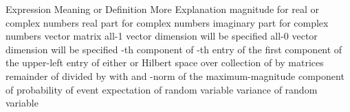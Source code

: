 \starttitle [title={Notation}]

\starttable[|l|l|l|] \HL
\NC Expression \VL Meaning or Definition \VL More Explanation \SR \HL
\NC {} \VL magnitude \VL for real or complex numbers \AR \HL
\NC {} \VL real part \VL for complex numbers \AR \HL
\NC {} \VL imaginary part \VL for complex numbers \AR \HL
\NC {} \VL vector \VL \AR \HL
\NC {} \VL matrix \VL \AR \HL
\NC {} \VL all-1 vector \VL dimension will be specified \AR \HL
\NC {} \VL all-0 vector \VL dimension will be specified \AR \HL
\NC {} \VL {}-th component of  \VL \AR \HL
\NC {} \VL {}-th entry of  \VL \AR \HL
\NC {} \VL the first component of  \VL  \AR \HL
\NC {} \VL the upper-left entry of  \VL  \AR \HL
\NC {} \VL either  or  \VL  \AR \HL
\NC {} \VL Hilbert space  over  \VL  \AR \HL
\NC {} \VL collection of  by  matrices \VL  \AR \HL
\NC {} \VL remainder of  divided by  \VL with  and  \AR \HL
\NC {} \VL {}-norm of  \VL {} \AR \HL
\NC {} \VL the maximum-magnitude \VL  \AR
\NC  \VL component of  \VL  \AR \HL
\NC {} \VL probability of event  \VL  \AR \HL
\NC {} \VL expectation of random variable  \VL  \AR \HL
\NC {} \VL variance of random variable  \VL  \AR \HL
\stoptable

\stopchapter
